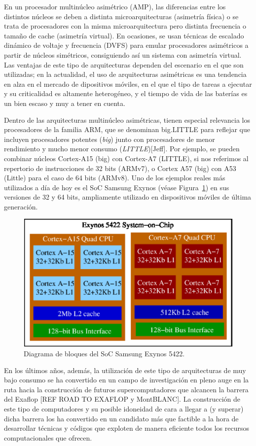 En un procesador multinúcleo asimétrico (AMP), las diferencias entre los distintos núcleos se
deben a distinta microarquitecturas (asimetría física) o se trata de procesadores con la misma
microarquitectura pero distinta frecuencia o tamaño de cache (asimetría virtual). En ocasiones,
se usan técnicas de escalado dinámico de voltaje y frecuencia (DVFS) para emular procesadores 
asimétricos a partir de núcleos simétricos, consiguiendo así un sistema con asimetría virtual. Las
ventajas de este tipo de arquitecturas dependen del escenario en el que son utilizadas; en la 
actualidad, el uso de arquitecturas asimétricas es una tendencia en alza en el mercado de 
dipositivos móviles, en el que el tipo de tareas a ejecutar y su criticalidad es altamente 
heterogéneo, y el tiempo de vida de las baterías es un bien escaso y muy a tener en cuenta.

Dentro de las arquitecturas multinúcleo asimétricas, tienen especial relevancia los procesadores de la familia
ARM, que se denominan big.LITTLE para reflejar que incluyen procesadores potentes ({\em big})
junto con procesadores de menor rendimiento y mucho menor consumo ({\em LITTLE})[Jeff]. Por
ejemplo, se pueden combinar núcleos Cortex-A15 (big) con Cortex-A7 (LITTLE), si nos referimos al repertorio de
instrucciones de 32 bits (ARMv7), o Cortex A57 (big) con A53 (Little) para el caso de 64 bits
(ARMv8). Uno de los ejemplos reales más utilizados a día de hoy es el SoC Samsung Exynos (véase Figura~\ref{fig:exynos})
 en sus versiones de 32 y 64 bits, ampliamente utilizado en dispositivos móviles de última generación.

\begin{figure}[th!]
\begin{center}
\includegraphics[width=0.4\columnwidth]{Figures/Exynos.eps}
\end{center}
\caption{\label{fig:exynos} Diagrama de bloques del SoC Samsung Exynos 5422.}
\end{figure}

En los últimos años, además, la utilización de este tipo de arquitecturas de muy bajo consumo se ha
convertido en un campo de investigación en pleno auge en la ruta hacia la construcción de futuros
supercomputadores que alcancen la barrera del Exaflop [REF ROAD TO EXAFLOP y MontBLANC]. La construcción
de este tipo de computadores y su posible idoneidad de cara a llegar a (y superar) dicha barrera
los ha convertido en un candidato más que factible a la hora de desarrollar técnicas y códigos
que exploten de manera eficiente todos los recursos computacionales que ofrecen.

